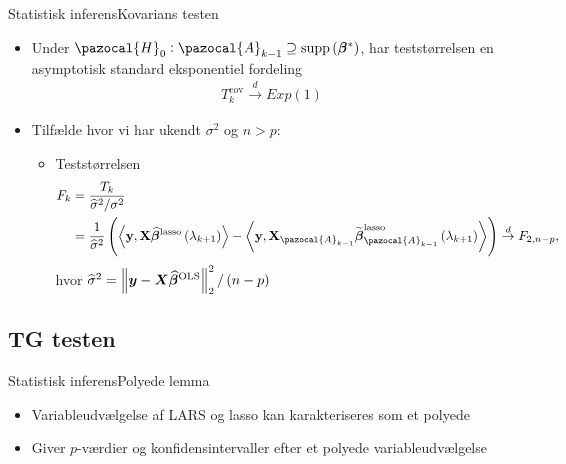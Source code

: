 \begin{frame}{Statistisk inferens}{Kovarians testen}
\begin{itemize}
\item Under $\pazocal{H}_0 : \pazocal{A}_{k-1} \supseteq \text{supp} \del{\boldsymbol\beta^*} $, har teststørrelsen en asymptotisk standard eksponentiel fordeling 
\begin{align*}
T_k^{\text{cov}} \overset{d}{\rightarrow} Exp(1)
\end{align*}
\item Tilfælde hvor vi har ukendt $\sigma^2$ og $n>p$: 
\begin{itemize}
\item Teststørrelsen
\begin{align*}
F_k & = \frac{T_k}{\widehat\sigma^2 /\sigma^2} \\
& = \frac{1}{\widehat\sigma^2}\del{ \left\langle \textbf{y}, \textbf{X} \widehat{\boldsymbol{\beta}}^\text{lasso} \del{\lambda_{k+1}} \right\rangle -  \left\langle  \textbf{y}, \textbf{X}_{\pazocal{A}_{k-1}}\widetilde{ \boldsymbol{{\beta}}}^\text{lasso}_{\pazocal{A}_{k-1}} \del{\lambda_{k+1}} \right\rangle} \overset{d}{\rightarrow} F_{2,n-p},
\end{align*}
hvor $\widehat{\sigma}^2 = \left\Vert \vy - \vX \boldsymbol{\widehat{\beta}}^\text{OLS} \right\Vert^2_2  / \del{n-p}$
\end{itemize}
\end{itemize}
\end{frame}

\subsection{TG testen}
\begin{frame}{Statistisk inferens}{Polyede lemma}
\begin{itemize}
\item Variableudvælgelse af LARS og lasso kan karakteriseres som et polyede
\item Giver $p$-værdier og konfidensintervaller efter et polyede variableudvælgelse
\end{itemize}
\end{frame}

